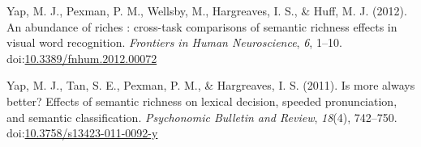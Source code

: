 \documentclass[english,,man]{apa6}
\theoremstyle{definition}
\theoremstyle{definition}
\theoremstyle{definition}
\theoremstyle{remark}
\begin{document}
\hypertarget{ref-Yap2012}{}
Yap, M. J., Pexman, P. M., Wellsby, M., Hargreaves, I. S., \& Huff, M.
J. (2012). An abundance of riches : cross-task comparisons of semantic
richness effects in visual word recognition. \emph{Frontiers in Human
Neuroscience}, \emph{6}, 1--10.
doi:\href{https://doi.org/10.3389/fnhum.2012.00072}{10.3389/fnhum.2012.00072}

\hypertarget{ref-Yap2011}{}
Yap, M. J., Tan, S. E., Pexman, P. M., \& Hargreaves, I. S. (2011). Is
more always better? Effects of semantic richness on lexical decision,
speeded pronunciation, and semantic classification. \emph{Psychonomic
Bulletin and Review}, \emph{18}(4), 742--750.
doi:\href{https://doi.org/10.3758/s13423-011-0092-y}{10.3758/s13423-011-0092-y}
\end{document}
